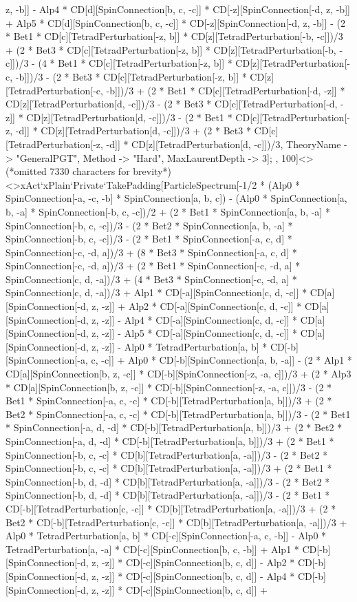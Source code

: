 z, -b]] - Alp4 * CD[d][SpinConnection[b, c, -c]] * CD[-z][SpinConnection[-d, z, -b]] + Alp5 * CD[d][SpinConnection[b, c, -c]] * CD[-z][SpinConnection[-d, z, -b]] - (2 * Bet1 * CD[c][TetradPerturbation[-z, b]] * CD[z][TetradPerturbation[-b, -c]])/3 + (2 * Bet3 * CD[c][TetradPerturbation[-z, b]] * CD[z][TetradPerturbation[-b, -c]])/3 - (4 * Bet1 * CD[c][TetradPerturbation[-z, b]] * CD[z][TetradPerturbation[-c, -b]])/3 - (2 * Bet3 * CD[c][TetradPerturbation[-z, b]] * CD[z][TetradPerturbation[-c, -b]])/3 + (2 * Bet1 * CD[c][TetradPerturbation[-d, -z]] * CD[z][TetradPerturbation[d, -c]])/3 - (2 * Bet3 * CD[c][TetradPerturbation[-d, -z]] * CD[z][TetradPerturbation[d, -c]])/3 - (2 * Bet1 * CD[c][TetradPerturbation[-z, -d]] * CD[z][TetradPerturbation[d, -c]])/3 + (2 * Bet3 * CD[c][TetradPerturbation[-z, -d]] * CD[z][TetradPerturbation[d, -c]])/3, TheoryName -> "GeneralPGT", Method -> "Hard", MaxLaurentDepth -> 3]; , 100]<>(*omitted 7330 characters for brevity*)<>xAct`xPlain`Private`TakePadding[ParticleSpectrum[-1/2 * (Alp0 * SpinConnection[-a, -c, -b] * SpinConnection[a, b, c]) - (Alp0 * SpinConnection[a, b, -a] * SpinConnection[-b, c, -c])/2 + (2 * Bet1 * SpinConnection[a, b, -a] * SpinConnection[-b, c, -c])/3 - (2 * Bet2 * SpinConnection[a, b, -a] * SpinConnection[-b, c, -c])/3 - (2 * Bet1 * SpinConnection[-a, c, d] * SpinConnection[-c, -d, a])/3 + (8 * Bet3 * SpinConnection[-a, c, d] * SpinConnection[-c, -d, a])/3 + (2 * Bet1 * SpinConnection[-c, -d, a] * SpinConnection[c, d, -a])/3 + (4 * Bet3 * SpinConnection[-c, -d, a] * SpinConnection[c, d, -a])/3 + Alp1 * CD[-a][SpinConnection[c, d, -c]] * CD[a][SpinConnection[-d, z, -z]] + Alp2 * CD[-a][SpinConnection[c, d, -c]] * CD[a][SpinConnection[-d, z, -z]] - Alp4 * CD[-a][SpinConnection[c, d, -c]] * CD[a][SpinConnection[-d, z, -z]] - Alp5 * CD[-a][SpinConnection[c, d, -c]] * CD[a][SpinConnection[-d, z, -z]] - Alp0 * TetradPerturbation[a, b] * CD[-b][SpinConnection[-a, c, -c]] + Alp0 * CD[-b][SpinConnection[a, b, -a]] - (2 * Alp1 * CD[a][SpinConnection[b, z, -c]] * CD[-b][SpinConnection[-z, -a, c]])/3 + (2 * Alp3 * CD[a][SpinConnection[b, z, -c]] * CD[-b][SpinConnection[-z, -a, c]])/3 - (2 * Bet1 * SpinConnection[-a, c, -c] * CD[-b][TetradPerturbation[a, b]])/3 + (2 * Bet2 * SpinConnection[-a, c, -c] * CD[-b][TetradPerturbation[a, b]])/3 - (2 * Bet1 * SpinConnection[-a, d, -d] * CD[-b][TetradPerturbation[a, b]])/3 + (2 * Bet2 * SpinConnection[-a, d, -d] * CD[-b][TetradPerturbation[a, b]])/3 + (2 * Bet1 * SpinConnection[-b, c, -c] * CD[b][TetradPerturbation[a, -a]])/3 - (2 * Bet2 * SpinConnection[-b, c, -c] * CD[b][TetradPerturbation[a, -a]])/3 + (2 * Bet1 * SpinConnection[-b, d, -d] * CD[b][TetradPerturbation[a, -a]])/3 - (2 * Bet2 * SpinConnection[-b, d, -d] * CD[b][TetradPerturbation[a, -a]])/3 - (2 * Bet1 * CD[-b][TetradPerturbation[c, -c]] * CD[b][TetradPerturbation[a, -a]])/3 + (2 * Bet2 * CD[-b][TetradPerturbation[c, -c]] * CD[b][TetradPerturbation[a, -a]])/3 + Alp0 * TetradPerturbation[a, b] * CD[-c][SpinConnection[-a, c, -b]] - Alp0 * TetradPerturbation[a, -a] * CD[-c][SpinConnection[b, c, -b]] + Alp1 * CD[-b][SpinConnection[-d, z, -z]] * CD[-c][SpinConnection[b, c, d]] - Alp2 * CD[-b][SpinConnection[-d, z, -z]] * CD[-c][SpinConnection[b, c, d]] - Alp4 * CD[-b][SpinConnection[-d, z, -z]] * CD[-c][SpinConnection[b, c, d]] + 